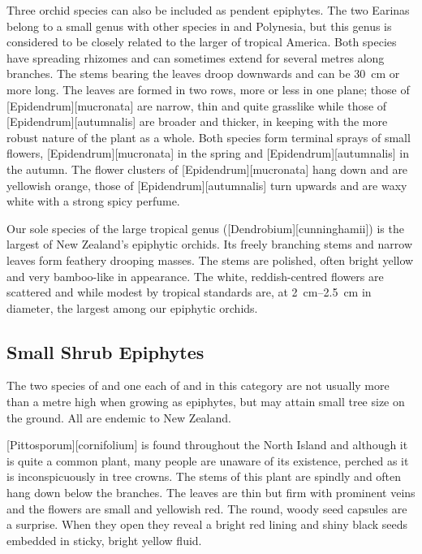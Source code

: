 Three orchid species can also be included as pendent epiphytes.
The two Earinas belong to a small genus with other species in  and Polynesia, but this genus is considered to be closely related to the larger  of tropical America.
Both species have spreading rhizomes and can sometimes extend for several metres along branches.
The stems bearing the leaves droop downwards and can be \SI{30}{\centi\metre} or more long.
The leaves are formed in two rows, more or less in one plane; those of [Epidendrum][mucronata] are narrow, thin and quite grasslike while those of [Epidendrum][autumnalis] are broader and thicker, in keeping with the more robust nature of the plant as a whole.
Both species form terminal sprays of small flowers, [Epidendrum][mucronata] in the spring and [Epidendrum][autumnalis] in the autumn.
The flower clusters of [Epidendrum][mucronata] hang down and are yellowish orange, those of [Epidendrum][autumnalis] turn upwards and are waxy white with a strong spicy perfume.

Our sole species of the large tropical genus  ([Dendrobium][cunninghamii]) is the largest of New Zealand's epiphytic orchids.
Its freely branching stems and narrow leaves form feathery drooping masses.
The stems are polished, often bright yellow and very bamboo-like in appearance.
The white, reddish-centred flowers are scattered and while modest by tropical standards are, at \SIrange{2}{2.5}{\centi\metre} in diameter, the largest among our epiphytic orchids.

\subsection{Small Shrub Epiphytes}

The two species of  and one each of  and  in this category are not usually more than a metre high when growing as epiphytes, but may attain small tree size on the ground.
All are endemic to New Zealand.

[Pittosporum][cornifolium] is found throughout the North Island and although it is quite a common plant, many people are unaware of its existence, perched as it is inconspicuously in tree crowns.
The stems of this plant are spindly and often hang down below the branches.
The leaves are thin but firm with prominent veins and the flowers are small and yellowish red.
The round, woody seed capsules are a surprise.
When they open they reveal a bright red lining and shiny black seeds embedded in sticky, bright yellow fluid.

